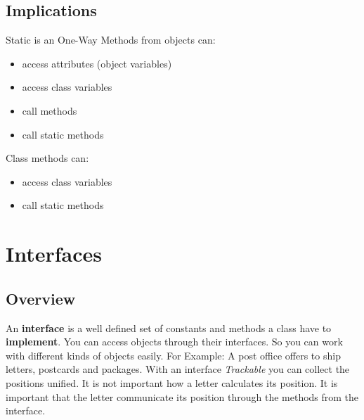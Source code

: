 \subsection{Implications}
\begin{frame}[fragile]{Static is an One-Way}
	Methods from objects can:
	\begin{itemize}
		\item access attributes (object variables)
		\item access class variables
		\item call methods
		\item call static methods
	\end{itemize}
	Class methods can:
	\begin{itemize}
		\item access class variables
		\item call static methods
	\end{itemize}
\end{frame}

\section{Interfaces}
\subsection{Overview}
\begin{frame}{}
	An \textbf{interface} is a well defined set of constants and methods a class have to \textbf{implement}.
	\vfill
	You can access objects through their interfaces. So you can work with different kinds of objects easily.
	\vfill
	For Example: A post office offers to ship letters, postcards and packages. With an interface
	\emph{Trackable} you can collect the positions unified. 
	It is not important how a letter calculates its position.
	It is important that the letter communicate its position through the methods from the interface.
\end{frame}
